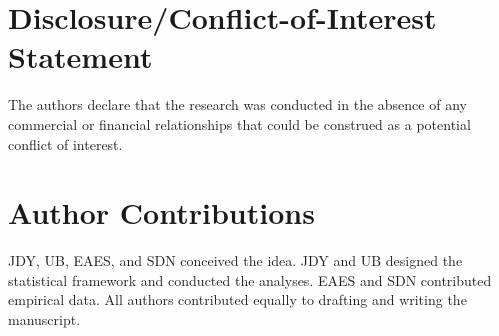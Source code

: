 \documentclass{frontiersSCNS}
\begin{document}
\section*{Disclosure/Conflict-of-Interest Statement}

The authors declare that the research was conducted in the absence of any commercial or financial relationships that could be construed as a potential conflict of interest.

\section*{Author Contributions}
JDY, UB, EAES, and SDN conceived the idea. 
JDY and UB designed the statistical framework and conducted the analyses. 
EAES and SDN contributed empirical data. 
All authors contributed equally to drafting and writing the manuscript. 
\end{document}
